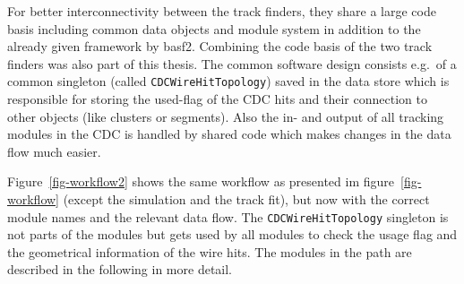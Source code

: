 For better interconnectivity between the track finders, they share a large code basis including common data objects and module system in addition to the already given framework by basf2. Combining the code basis of the two track finders was also part of this thesis. The common software design consists e.g.\ of a common singleton (called \texttt{CDCWireHitTopology}) saved in the data store which is responsible for storing the used-flag of the CDC hits and their connection to other objects (like clusters or segments). Also the in- and output of all tracking modules in the CDC is handled by shared code which makes changes in the data flow much easier.

Figure~\ref{fig-workflow2} shows the same workflow as presented im figure~\ref{fig-workflow} (except the simulation and the track fit), but now with the correct module names and the relevant data flow. The \texttt{CDCWireHitTopology} singleton is not parts of the modules but gets used by all modules to check the usage flag and the geometrical information of the wire hits. The modules in the path are described in the following in more detail.

